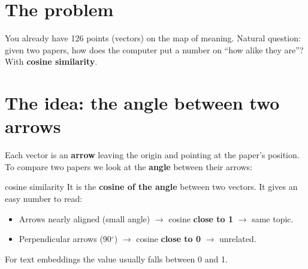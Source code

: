 \documentclass[11pt,a4paper]{article}
\begin{document}

\section{The problem}

You already have 126 points (vectors) on the map of meaning. Natural question: given two
papers, how does the computer put a number on ``how alike they are''? With \textbf{cosine
similarity}.

\section{The idea: the angle between two arrows}

Each vector is an \textbf{arrow} leaving the origin and pointing at the paper's position. To
compare two papers we look at the \textbf{angle} between their arrows:

\begin{center}
\end{center}

\begin{concepto}{cosine similarity}
It is the \textbf{cosine of the angle} between two vectors. It gives an easy number to read:
\begin{itemize}
  \item Arrows nearly aligned (small angle) $\rightarrow$ cosine \textbf{close to 1}
        $\rightarrow$ same topic.
  \item Perpendicular arrows (90$^\circ$) $\rightarrow$ cosine \textbf{close to 0}
        $\rightarrow$ unrelated.
\end{itemize}
For text embeddings the value usually falls between 0 and 1.
\end{concepto}
\end{document}
